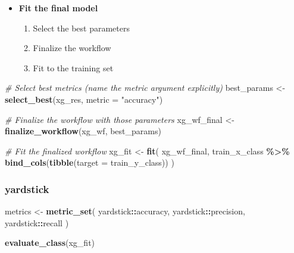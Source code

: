 \documentclass[
]{book}
\newenvironment{Shaded}{\begin{snugshade}}{\end{snugshade}}
\newcommand{\AttributeTok}[1]{\textcolor[rgb]{0.13,0.29,0.53}{#1}}
\newcommand{\CommentTok}[1]{\textcolor[rgb]{0.56,0.35,0.01}{\textit{#1}}}
\newcommand{\FunctionTok}[1]{\textcolor[rgb]{0.13,0.29,0.53}{\textbf{#1}}}
\newcommand{\NormalTok}[1]{#1}
\newcommand{\OtherTok}[1]{\textcolor[rgb]{0.56,0.35,0.01}{#1}}
\newcommand{\SpecialCharTok}[1]{\textcolor[rgb]{0.81,0.36,0.00}{\textbf{#1}}}
\newcommand{\StringTok}[1]{\textcolor[rgb]{0.31,0.60,0.02}{#1}}
\providecommand{\tightlist}{%
  \setlength{\itemsep}{0pt}\setlength{\parskip}{0pt}}
\begin{document}
\begin{itemize}
\item
  \textbf{Fit the final model}

  \begin{enumerate}
  \def\labelenumi{\arabic{enumi}.}
  \tightlist
  \item
    Select the best parameters
  \item
    Finalize the workflow
  \item
    Fit to the training set
  \end{enumerate}
\end{itemize}

\begin{Shaded}
\begin{Highlighting}[]
\CommentTok{\# Select best metrics (name the metric argument explicitly)}
\NormalTok{best\_params }\OtherTok{\textless{}{-}} \FunctionTok{select\_best}\NormalTok{(xg\_res, }\AttributeTok{metric =} \StringTok{"accuracy"}\NormalTok{)}

\CommentTok{\# Finalize the workflow with those parameters}
\NormalTok{xg\_wf\_final }\OtherTok{\textless{}{-}} \FunctionTok{finalize\_workflow}\NormalTok{(xg\_wf, best\_params)}

\CommentTok{\# Fit the finalized workflow}
\NormalTok{xg\_fit }\OtherTok{\textless{}{-}} \FunctionTok{fit}\NormalTok{(}
\NormalTok{  xg\_wf\_final,}
\NormalTok{  train\_x\_class }\SpecialCharTok{\%\textgreater{}\%}
    \FunctionTok{bind\_cols}\NormalTok{(}\FunctionTok{tibble}\NormalTok{(}\AttributeTok{target =}\NormalTok{ train\_y\_class))}
\NormalTok{)}
\end{Highlighting}
\end{Shaded}

\subsubsection{yardstick}\label{yardstick-3}

\begin{Shaded}
\begin{Highlighting}[]
\NormalTok{metrics }\OtherTok{\textless{}{-}} \FunctionTok{metric\_set}\NormalTok{(}
\NormalTok{  yardstick}\SpecialCharTok{::}\NormalTok{accuracy,}
\NormalTok{  yardstick}\SpecialCharTok{::}\NormalTok{precision,}
\NormalTok{  yardstick}\SpecialCharTok{::}\NormalTok{recall}
\NormalTok{)}

\FunctionTok{evaluate\_class}\NormalTok{(xg\_fit)}
\end{Highlighting}
\end{Shaded}
\end{document}
